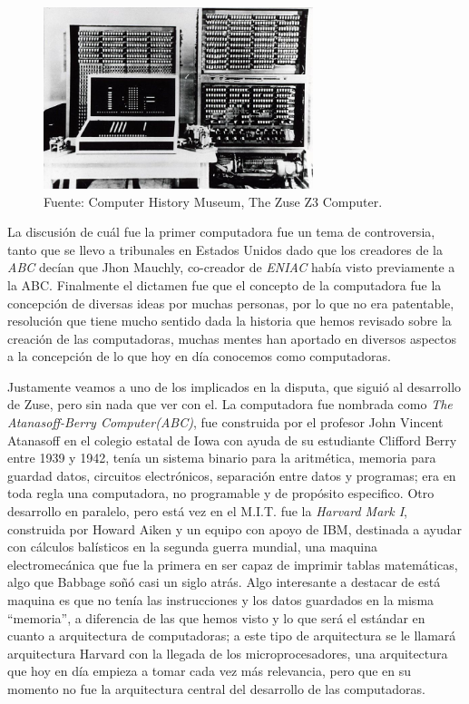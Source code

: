 \documentclass[letterpaper,12pt,oneside]{book}
\begin{document}
		\begin{figure}
		    \centering
		    \includegraphics[width=0.7\textwidth]{media/Historia/CHM_computers_1941.zusez3.jpg}
		    \caption{Fuente: Computer History Museum, The Zuse Z3 Computer.}
	    	\label{fig:zuse_z3}
		\end{figure}
		
		
		
		
		La discusión de cuál fue la primer computadora fue un tema de controversia, tanto que se llevo a tribunales en Estados Unidos dado que los creadores
		de la \textit{ABC} decían que Jhon Mauchly, co-creador de \textit{ENIAC} había visto previamente a la ABC. Finalmente el dictamen fue
		que el concepto de la computadora fue la concepción de diversas ideas por muchas personas, por lo que no era patentable, resolución que tiene mucho sentido
		dada la historia que hemos revisado sobre la creación de las computadoras, muchas mentes han aportado en diversos aspectos a la concepción de lo que hoy
		en día conocemos como computadoras\cite{computer_history_museum_computers_nodate}.
		
		
		Justamente veamos a uno de los implicados en la disputa, que siguió al desarrollo de Zuse, pero sin nada que ver con el. La computadora fue nombrada como 
		\textit{The Atanasoff-Berry Computer(ABC)}, fue construida por el profesor John Vincent Atanasoff 
		en el colegio estatal de Iowa con ayuda de su estudiante Clifford Berry entre 1939 y 1942, tenía un sistema binario para la aritmética, memoria
		para guardad datos, circuitos electrónicos, separación entre datos y programas; era en toda regla una computadora, no programable y de propósito
		especifico. Otro desarrollo en paralelo, pero
		está vez en el M.I.T. fue la \textit{Harvard Mark I}, construida por Howard Aiken y un equipo con apoyo de IBM, destinada a ayudar con cálculos balísticos
		en la segunda guerra mundial, una maquina electromecánica que fue la primera en ser capaz de imprimir tablas matemáticas, algo que Babbage soñó casi un
		siglo atrás\cite[p. 212-218]{ifrah_universal_2001}. Algo interesante a destacar de está maquina es que no tenía las instrucciones y los datos guardados en la misma 
		``memoria'', a diferencia de las que hemos
		visto y lo que será el estándar en cuanto a arquitectura de computadoras; a este tipo de arquitectura se le llamará
		arquitectura Harvard con la llegada de los microprocesadores, una arquitectura que hoy en día empieza a tomar cada vez más relevancia, pero que en su momento
		no fue la arquitectura central del desarrollo de las computadoras\cite{pawson_myth_2022}.
		
\end{document}
